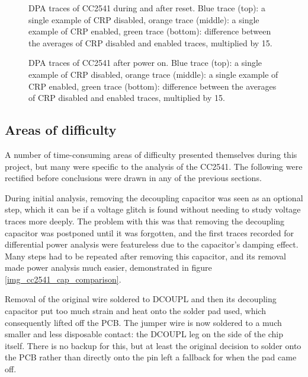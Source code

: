 \begin{figure}
  \begin{center}
      
  \end{center}
  \caption{DPA traces of CC2541 during and after reset. Blue trace (top): a single example of CRP disabled, orange trace (middle): a single example of CRP enabled, green trace (bottom): difference between the averages of CRP disabled and enabled traces, multiplied by 15.\label{img_cc2541_reset_comparison}}
\end{figure}

\begin{figure}
  \begin{center}
      
  \end{center}
  \caption{DPA traces of CC2541 after power on. Blue trace (top): a single example of CRP disabled, orange trace (middle): a single example of CRP enabled, green trace (bottom): difference between the averages of CRP disabled and enabled traces, multiplied by 15.\label{img_cc2541_coldboot_comparison}}
\end{figure}

\hypertarget{areas-of-difficulty}{%
\subsection{Areas of difficulty}\label{areas-of-difficulty}}

A number of time-consuming areas of difficulty presented themselves
during this project, but many were specific to the analysis of the
CC2541. The following were rectified before conclusions were drawn in
any of the previous sections.

During initial analysis, removing the decoupling capacitor was seen as
an optional step, which it can be if a voltage glitch is found without
needing to study voltage traces more deeply. The problem with this was
that removing the decoupling capacitor was postponed until it was
forgotten, and the first traces recorded for differential power analysis
were featureless due to the capacitor's damping effect. Many steps had
to be repeated after removing this capacitor, and its removal made power
analysis much easier, demonstrated in figure
\ref{img_cc2541_cap_comparison}.

Removal of the original wire soldered to DCOUPL and then its decoupling
capacitor put too much strain and heat onto the solder pad used, which
consequently lifted off the PCB. The jumper wire is now soldered to a
much smaller and less disposable contact: the DCOUPL leg on the side of
the chip itself. There is no backup for this, but at least the original
decision to solder onto the PCB rather than directly onto the pin left a
fallback for when the pad came off.

